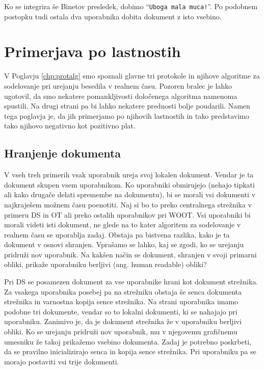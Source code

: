\documentclass[a4paper, 12pt, twoside]{book}
\begin{document}
Ko se integrira še Binetov presledek, dobimo “{\tt Uboga mala muca!}”. Po podobnem postopku tudi ostala dva uporabnika dobita dokument z isto vsebino.

\chapter{Primerjava po lastnostih}

V Poglavju \ref{chp:protalg} smo spoznali glavne tri protokole in njihove algoritme za sodelovanje pri urejanju besedila v realnem času. Pozoren bralec je lahko ugotovil, da smo nekatere pomankljivosti določenega algoritma namenoma spustili. Na drugi strani pa bi lahko nekatere prednosti bolje poudarili. Namen tega poglavja je, da jih primerjamo po njihovih lastnostih in tako predstavimo tako njihovo negativno kot pozitivno plat.

\section{Hranjenje dokumenta}

V vseh treh primerih vsak uporabnik ureja svoj lokalen dokument. Vendar je ta dokument skupen vsem uporabnikom. Ko uporabniki obmirujejo (nehajo tipkati ali kako drugače delati spremembe na dokumentu), bi se morali vsi dokumenti v najkraješem možnem času poenotiti. Naj si bo to preko centralnega strežnika v primeru DS in OT ali preko ostalih uporabnikov pri WOOT. Vsi uporabniki bi morali videti isti dokument, ne glede na to kater algoritem za sodelovanje v realnem času se uporablja zadaj. Obstaja pa bistvena razlika, kako je ta dokument v osnovi shranjen. Vprašamo se lahko, kaj se zgodi, ko se urejanju pridruži nov uporabnik. Na kakšen način se dokument, shranjen v svoji primarni obliki, prikaže uporabniku berljivi (ang. human readable) obliki?

Pri DS se posamezen dokument za vse uporabnike hrani kot dokument strežnika. Za vsakega uporabnika posebej pa na strežniku obstaja še senca dokumenta strežnika in varnostna kopija sence strežnika. Na strani uporabnika imamo podobne tri dokumente, vendar so to lokalni dokumenti, ki se nahajajo pri uporabniku. Zanimivo je, da je dokument strežnika že v uporabniku berljivi obliki. Ko se urejanju pridruži nov uporabnik, mu v njegovemu grafičnemu umesniku že takoj prikažemo vsebino dokumenta. Zadaj je potrebno poskrbeti, da se pravilno inicializirajo senca in kopija sence strežnika. Pri uporabniku pa se morajo postaviti vsi trije dokumenti.
\end{document}
